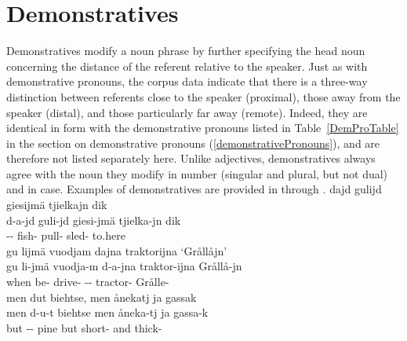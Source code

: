 \section{Demonstratives}\label{demonstratives}
Demonstratives %
modify a noun phrase by further specifying the head noun concerning the distance of the referent relative to the speaker. Just as with demonstrative pronouns, the corpus data indicate that there is a three-way distinction between referents close to the speaker (proximal), those away from the speaker (distal), and those particularly far away (remote). 
Indeed, they are identical in form with the demonstrative pronouns listed in Table~\vref{DemProTable} in the section on demonstrative pronouns (\SEC\ref{demonstrativePronouns}), and are therefore not listed separately here. 
Unlike adjectives, demonstratives always agree with the noun they modify in number (singular and plural, but not dual) and in case. %
Examples of demonstratives %
are provided in  through .
\ea\label{demonstrativeAdjectivesEx1}
\glll	dajd gulijd giesijmä tjielkajn dik\\
	d-a-jd guli-jd giesi-jmä tjielka-jn dik\\
	-- fish- pull- sled- to.here\\\nopagebreak
{}	
\z
\ea\label{demonstrativeAdjectivesEx2}
\glll	gu lijmä vuodjam dajna traktorijna ‘Grållåjn’\\
	gu li-jmä vuodja-m d-a-jna traktor-ijna Grållå-jn\\
	when be- drive- -- tractor- Grålle-\\\nopagebreak
{}	
\z
\ea\label{demonstrativeAdjectivesEx3}
\glll	men dut biehtse, men ånekatj ja gassak\\
	men d-u-t biehtse men åneka-tj ja gassa-k\\
	but -- pine\BS{} but short- and thick-\\\nopagebreak
{}	
\z




